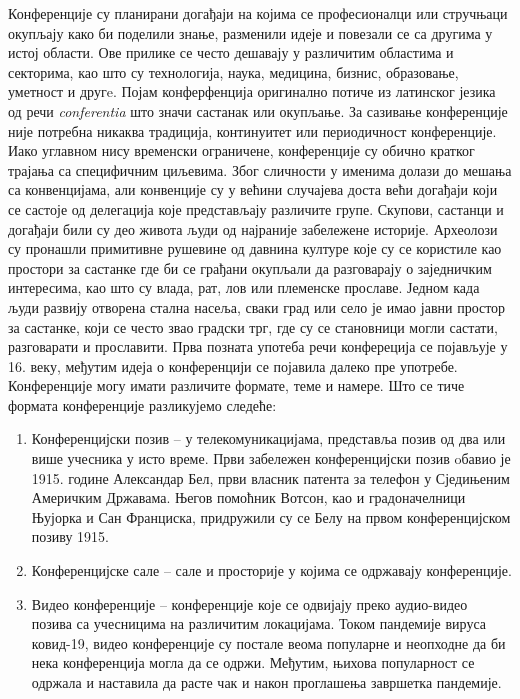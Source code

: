 \documentclass[12pt]{article}
\begin{document}
Конференције су планирани догађаји на којима се професионалци или стручњаци окупљају како би поделили знање, разменили идеје и повезали се са другима у истој области. Ове прилике се често дешавају у различитим областима и секторима, као што су технологија, наука, медицина, бизнис, образовање, уметност и другe. Појам конферфенција оригинално потиче из латинског језика од речи \textit{conferentia} што значи састанак или окупљање. За сазивање конференције није потребна никаква традиција, континуитет или периодичност конференције. Иако углавном нису временски ограничене, конференције су обично кратког трајања
са специфичним циљевима. Због сличности у именима долази до мешања са конвенцијама, али конвенције су у већини случајева доста већи догађаји који се састоје од делегација које представљају различите групе.
Скупови, састанци и догађаји били су део живота људи од најраније забележене историје. Археолози су пронашли примитивне рушевине од давнина културе које су се користиле као простори за састанке где би се грађани окупљали да разговарају о заједничким интересима, као што су влада, рат, лов или племенске прославе. Једном када људи развију отворена стална насеља, сваки град или село је имао јавни простор за састанке, који се често звао градски трг, где су се становници могли састати, разговарати и прославити. Прва позната употеба речи конфереција се појављује у 16. веку, међутим идеја о конференцији се појавила далеко пре употребе. 
Конференције могу имати различите формате, теме и намере. Што се тиче формата конференције разликујемо следеће:
\begin{enumerate}
    \item Конференцијски позив – у телекомуникацијама, представља позив од два или више учесника у исто време. Први забележен конференцијски позив oбавио је 1915. године Александар Бел, први власник патента за телефон у Сједињеним Америчким Државама. Његов помоћник Вотсон, као и градоначелници Њујорка и Сан Франциска, придружили су се Белу на првом конференцијском позиву 1915.
    \item Конференцијске сале – сале и просторије у којима се одржавају конференције.
    \item Видео конференције – конференције које се одвијају преко аудио-видео позива са учесницима на различитим локацијама. Током пандемије вируса ковид-19, видео конференције су постале веома популарне и неопходне да би нека конференција могла да се одржи. Међутим, њихова популарност се одржала и наставила да расте чак и након проглашења завршетка пандемије.
\end{enumerate}
\end{document}
